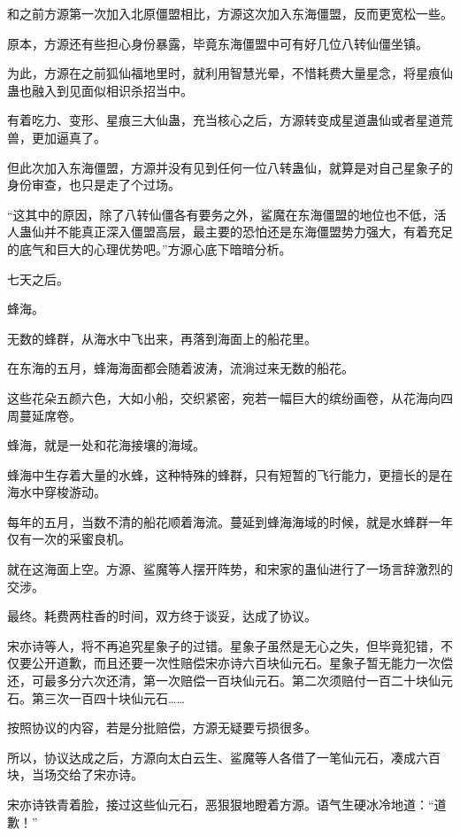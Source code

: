 
\begin{this_body}

和之前方源第一次加入北原僵盟相比，方源这次加入东海僵盟，反而更宽松一些。

原本，方源还有些担心身份暴露，毕竟东海僵盟中可有好几位八转仙僵坐镇。

为此，方源在之前狐仙福地里时，就利用智慧光晕，不惜耗费大量星念，将星痕仙蛊也融入到见面似相识杀招当中。

有着吃力、变形、星痕三大仙蛊，充当核心之后，方源转变成星道蛊仙或者星道荒兽，更加逼真了。

但此次加入东海僵盟，方源并没有见到任何一位八转蛊仙，就算是对自己星象子的身份审查，也只是走了个过场。

“这其中的原因，除了八转仙僵各有要务之外，鲨魔在东海僵盟的地位也不低，活人蛊仙并不能真正深入僵盟高层，最主要的恐怕还是东海僵盟势力强大，有着充足的底气和巨大的心理优势吧。”方源心底下暗暗分析。

七天之后。

蜂海。

无数的蜂群，从海水中飞出来，再落到海面上的船花里。

在东海的五月，蜂海海面都会随着波涛，流淌过来无数的船花。

这些花朵五颜六色，大如小船，交织紧密，宛若一幅巨大的缤纷画卷，从花海向四周蔓延席卷。

蜂海，就是一处和花海接壤的海域。

蜂海中生存着大量的水蜂，这种特殊的蜂群，只有短暂的飞行能力，更擅长的是在海水中穿梭游动。

每年的五月，当数不清的船花顺着海流。蔓延到蜂海海域的时候，就是水蜂群一年仅有一次的采蜜良机。

就在这海面上空。方源、鲨魔等人摆开阵势，和宋家的蛊仙进行了一场言辞激烈的交涉。

最终。耗费两柱香的时间，双方终于谈妥，达成了协议。

宋亦诗等人，将不再追究星象子的过错。星象子虽然是无心之失，但毕竟犯错，不仅要公开道歉，而且还要一次性赔偿宋亦诗六百块仙元石。星象子暂无能力一次偿还，可最多分六次还清，第一次赔偿一百块仙元石。第二次须赔付一百二十块仙元石。第三次一百四十块仙元石……

按照协议的内容，若是分批赔偿，方源无疑要亏损很多。

所以，协议达成之后，方源向太白云生、鲨魔等人各借了一笔仙元石，凑成六百块，当场交给了宋亦诗。

宋亦诗铁青着脸，接过这些仙元石，恶狠狠地瞪着方源。语气生硬冰冷地道：“道歉！”


\end{this_body}
